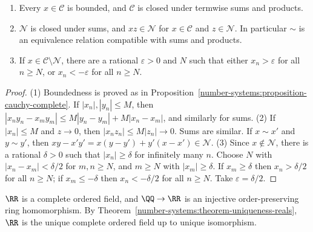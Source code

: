\begin{lemma}\label{number-systems:lemma-cauchy-rationals}
\begin{enumerate}
\item Every $x \in \mathcal{C}$ is bounded, and $\mathcal{C}$ is closed under
termwise sums and products.
\item $\mathcal{N}$ is closed under sums, and $xz \in \mathcal{N}$ for
$x \in \mathcal{C}$ and $z \in \mathcal{N}$. In particular $\sim$ is an equivalence
relation compatible with sums and products.
\item If $x \in \mathcal{C} \setminus \mathcal{N}$, there are a rational
$\varepsilon > 0$ and $N$ such that either $x_n > \varepsilon$ for all $n \geq N$,
or $x_n < -\varepsilon$ for all $n \geq N$.
\end{enumerate}
\end{lemma}

\begin{proof}
(1) Boundedness is proved as in
Proposition~\ref{number-systems:proposition-cauchy-complete}. If $|x_n|, |y_n| \leq M$,
then $|x_ny_n - x_my_m| \leq M|y_n - y_m| + M|x_n - x_m|$, and similarly for sums.
(2) If $|x_n| \leq M$ and $z \to 0$, then $|x_n z_n| \leq M|z_n| \to 0$. Sums are
similar. If $x \sim x'$ and $y \sim y'$, then
$xy - x'y' = x(y - y') + y'(x - x') \in \mathcal{N}$.
(3) Since $x \notin \mathcal{N}$, there is a rational $\delta > 0$ such that
$|x_n| \geq \delta$ for infinitely many $n$. Choose $N$ with
$|x_n - x_m| < \delta/2$ for $m, n \geq N$, and $m \geq N$ with $|x_m| \geq \delta$.
If $x_m \geq \delta$ then $x_n > \delta/2$ for all $n \geq N$; if $x_m \leq -\delta$
then $x_n < -\delta/2$ for all $n \geq N$. Take $\varepsilon = \delta/2$.
\end{proof}

\begin{theorem}\label{number-systems:theorem-reals}
$\RR$ is a complete ordered field, and $\QQ \to \RR$ is an injective
order-preserving ring homomorphism. By
Theorem~\ref{number-systems:theorem-uniqueness-reals}, $\RR$ is the unique complete
ordered field up to unique isomorphism.
\end{theorem}

